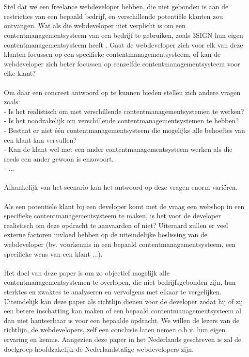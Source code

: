 \\\\
Stel dat we een freelance webdeveloper hebben, die niet gebonden is aan de restricties van een bepaald bedrijf, en verschillende potentiële klanten zou ontvangen. Wat als die webdeveloper niet verplicht is om een contentmanagementsysteem van een bedrijf te gebruiken, zoals 3SIGN hun eigen contentmanagementsysteem heeft \autocite{Meiresonne2008}. Gaat de webdeveloper zich voor elk van deze klanten focussen op een specifieke contentmanagementsysteem, of kan de webdeveloper zich beter focussen op eenzelfde contentmanagementsysteem voor elke klant? 
\\\\
Om daar een concreet antwoord op te kunnen bieden stellen zich andere vragen zoals:\\
- Is het realistisch om met verschillende contentmanagementsystemen te werken?\\
- Is het noodzakelijk om verschillende contentmanagementsystemen te hebben?\\
- Bestaat er niet één contentmanagementsysteem die mogelijks alle behoeftes van een klant kan vervullen?\\ 
- Kan de klant wel met een ander contentmanagementsysteem werken als die reeds een ander gewoon is enzovoort.\\
- ... 
\\\\
Afhankelijk van het scenario kan het antwoord op deze vragen enorm variëren. 
\\\\
Als een potentiële klant bij een developer komt met de vraag een webshop in een specifieke contentmanagementsysteem te maken, is het voor de developer realistisch om deze opdracht te aanvaarden of niet? Uiteraard zullen er veel externe factoren invloed hebben op de uiteindelijke beslissing van de webdeveloper (bv. voorkennis in een bepaald contentmanagementsysteem, een specifieke wens van een klant ...). 
\\\\
Het doel van deze paper is om zo objectief mogelijk alle contentmanagementsystemen te overlopen, die niet bedrijfsgebonden zijn, hun sterktes en zwaktes te analyseren en vervolgens met elkaar te vergelijken. Uiteindelijk kan deze paper als richtlijn dienen voor de developer zodat hij of zij een betere inschatting kan maken of een bepaald contentmanagementsysteem al dan niet hanteerbaar is voor een bepaalde opdracht. We willen de lezers van de richtlijn, de webdevelopers, zelf een conclusie laten nemen o.b.v. hun eigen ervaring en kennis. Aangezien deze paper in het Nederlands geschreven is zal de doelgroep hoofdzakelijk de Nederlandstalige webdevelopers zijn.
\\\\

